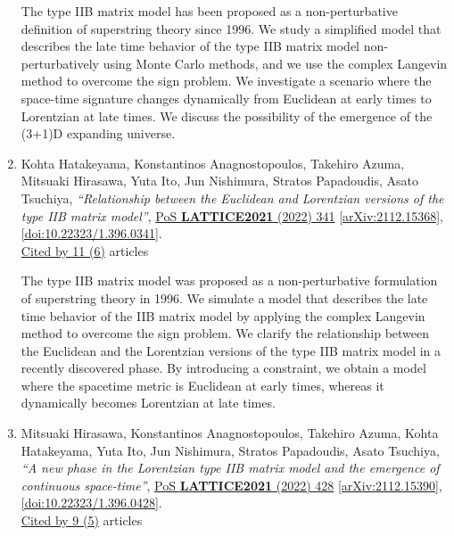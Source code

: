 \documentclass[a4paper,10pt]{article}
\begin{document}
\begin{enumerate}
The type IIB matrix model has been proposed as a non-perturbative definition of superstring theory since 1996. We study a simplified model that describes the late time behavior of the type IIB matrix model non-perturbatively using Monte Carlo methods, and we use the complex Langevin method to overcome the sign problem. We investigate a scenario where the space-time signature changes dynamically from Euclidean at early times to Lorentzian at late times. We discuss the possibility of the emergence of the (3+1)D expanding universe.
\item Kohta Hatakeyama, Konstantinos Anagnostopoulos, Takehiro Azuma, Mitsuaki Hirasawa, Yuta Ito, Jun Nishimura, Stratos Papadoudis, Asato Tsuchiya, {\it ``Relationship between the Euclidean and Lorentzian versions of the type IIB matrix model''}, \href{https://www.doi.org/10.22323/1.396.0341}{PoS {\bf LATTICE2021} (2022) 341} \href{https://arxiv.org/abs/2112.15368}{[arXiv:2112.15368]}, \href{https://www.doi.org/10.22323/1.396.0341}{[doi:10.22323/1.396.0341]}.
\\\href{https://inspirehep.net/literature/?q=refersto%3Arecid%3A1998854}{Cited by 11 (6)} articles

The type IIB matrix model was proposed as a non-perturbative formulation of superstring theory in 1996. We simulate a model that describes the late time behavior of the IIB matrix model by applying the complex Langevin method to overcome the sign problem. We clarify the relationship between the Euclidean and the Lorentzian versions of the type IIB matrix model in a recently discovered phase. By introducing a constraint, we obtain a model where the spacetime metric is Euclidean at early times, whereas it dynamically becomes Lorentzian at late times.
\item Mitsuaki Hirasawa, Konstantinos Anagnostopoulos, Takehiro Azuma, Kohta Hatakeyama, Yuta Ito, Jun Nishimura, Stratos Papadoudis, Asato Tsuchiya, {\it ``A new phase in the Lorentzian type IIB matrix model and the emergence of continuous space-time''}, \href{https://www.doi.org/10.22323/1.396.0428}{PoS {\bf LATTICE2021} (2022) 428} \href{https://arxiv.org/abs/2112.15390}{[arXiv:2112.15390]}, \href{https://www.doi.org/10.22323/1.396.0428}{[doi:10.22323/1.396.0428]}.
\\\href{https://inspirehep.net/literature/?q=refersto%3Arecid%3A1998865}{Cited by 9 (5)} articles


\end{enumerate}
\end{document}
